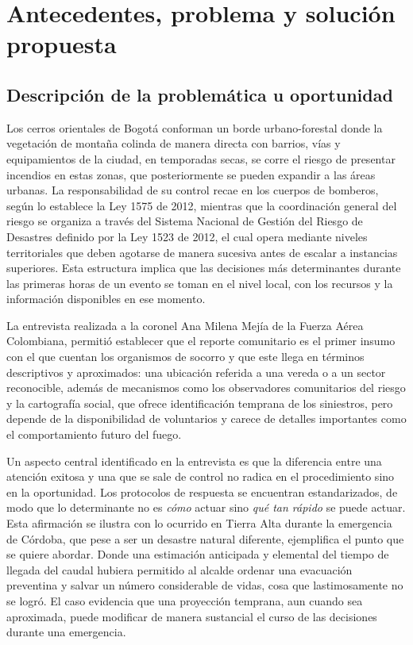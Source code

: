 \section{Antecedentes, problema y solución propuesta}

\subsection{Descripción de la problemática u oportunidad}

Los cerros orientales de Bogotá conforman un borde urbano-forestal donde la vegetación de montaña colinda de manera directa con barrios, vías y equipamientos de la ciudad, en temporadas secas, se corre el riesgo de presentar incendios en estas zonas, que posteriormente se pueden expandir a las áreas urbanas. La responsabilidad de su control recae en los cuerpos de bomberos, según lo establece la Ley 1575 de 2012, mientras que la coordinación general del riesgo se organiza a través del Sistema Nacional de Gestión del Riesgo de Desastres definido por la Ley 1523 de 2012, el cual opera mediante niveles territoriales que deben agotarse de manera sucesiva antes de escalar a instancias superiores. Esta estructura implica que las decisiones más determinantes durante las primeras horas de un evento se toman en el nivel local, con los recursos y la información disponibles en ese momento.

La entrevista realizada a la coronel Ana Milena Mejía de la Fuerza Aérea Colombiana, permitió establecer que el reporte comunitario es el primer insumo con el que cuentan los organismos de socorro y que este llega en términos descriptivos y aproximados: una ubicación referida a una vereda o a un sector reconocible, además de mecanismos como los observadores comunitarios del riesgo y la cartografía social, que ofrece identificación temprana de los siniestros, pero depende de la disponibilidad de voluntarios y carece de detalles importantes como el comportamiento futuro del fuego.
  
Un aspecto central identificado en la entrevista es que la diferencia entre una atención exitosa y una que se sale de control no radica en el procedimiento sino en la oportunidad. Los protocolos de respuesta se encuentran estandarizados, de modo que lo determinante no es \emph{cómo} actuar sino \emph{qué tan rápido} se puede actuar. Esta afirmación se ilustra con lo ocurrido en Tierra Alta durante la emergencia de Córdoba, que pese a ser un desastre natural diferente, ejemplifica el punto que se quiere abordar. Donde una estimación anticipada y elemental del tiempo de llegada del caudal hubiera permitido al alcalde ordenar una evacuación preventina y salvar un número considerable de vidas, cosa que lastimosamente no se logró. El caso evidencia que una proyección temprana, aun cuando sea aproximada, puede modificar de manera sustancial el curso de las decisiones durante una emergencia.

